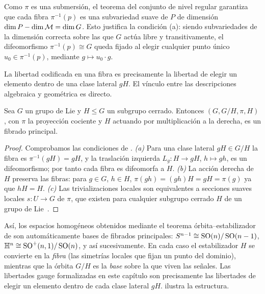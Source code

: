 \begin{remark}
\label{rem:gauge:fibres-submanifold}
Como $\pi$ es una submersi\'on, el teorema del conjunto de nivel regular
garantiza que cada fibra $\pi^{-1}(p)$ es una subvariedad suave de $P$ de
dimensi\'on $\dim P - \dim \mathcal{M} = \dim G$. Esto justifica la condici\'on (a):
siendo subvariedades de la dimensi\'on correcta sobre las que $G$ act\'ua libre y
transitivamente, el difeomorfismo $\pi^{-1}(p) \cong G$ queda fijado al elegir
cualquier punto \'unico $u_0 \in \pi^{-1}(p)$, mediante $g \mapsto u_0 \cdot g$.
\end{remark}

La libertad codificada en una fibra es precisamente la libertad de elegir un
elemento dentro de una clase lateral $gH$. El v\'inculo entre las descripciones
algebraica y geom\'etrica es directo.

\begin{proposition}
\label{prop:gauge:homog-bundle}
Sea $G$ un grupo de Lie y $H \le G$ un subgrupo cerrado. Entonces
$(G, G/H, \pi, H)$, con $\pi$ la proyecci\'on cociente y $H$ actuando por
multiplicaci\'on a la derecha, es un fibrado principal.
\end{proposition}

\begin{proof}
Comprobamos las condiciones de .
\emph{(a)} Para una clase lateral $gH \in G/H$ la fibra es $\pi^{-1}(gH) = gH$, y
la traslaci\'on izquierda $L_g\colon H \to gH$, $h \mapsto gh$, es un
difeomorfismo; por tanto cada fibra es difeomorfa a $H$.
\emph{(b)} La acci\'on derecha de $H$ preserva las fibras: para $g \in G$,
$h \in H$, $\pi(gh) = (gh)H = gH = \pi(g)$ ya que $hH = H$.
\emph{(c)} Las trivializaciones locales son equivalentes a secciones suaves
locales $s\colon U \to G$ de $\pi$, que existen para cualquier subgrupo cerrado
$H$ de un grupo de Lie~\citep[Ch.~I, Prop.~5.5]{Kobayashi1996}.
\end{proof}

As\'i, los espacios homog\'eneos obtenidos mediante el teorema
\'orbita--estabilizador de  son autom\'aticamente bases de
fibrados principales: $S^{n-1} \cong \operatorname{SO}(n)/\operatorname{SO}(n-1)$, $\mathbb{H}^n \cong
\operatorname{SO}^+(n,1)/\operatorname{SO}(n)$, y as\'i sucesivamente. En cada caso el estabilizador $H$ se
convierte en la \emph{fibra} (las simetr\'ias locales que fijan un punto del
dominio), mientras que la \'orbita $G/H$ es la \emph{base} sobre la que viven las
se\~nales. Las libertades gauge formalizadas en este cap\'itulo son precisamente
las libertades de elegir un elemento dentro de cada clase lateral $gH$.
 ilustra la estructura.

